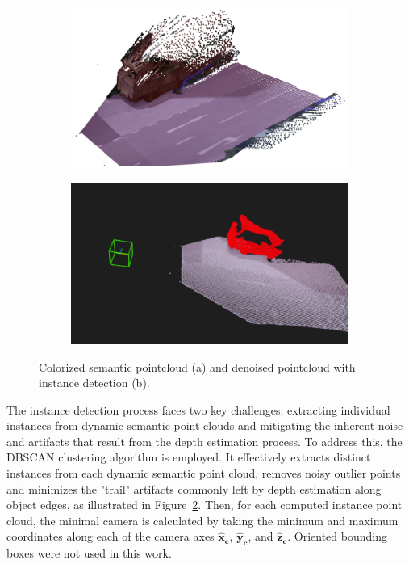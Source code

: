 \begin{figure}[!ht]
    \centering
    \begin{subfigure}[b]{0.45\textwidth}
        \includegraphics[width=\linewidth]{images/methodology/pcd_semantic.png}
        \caption{}
        \label{fig:semantic_pointcloud_a}
    \end{subfigure}
    \hfill
    \begin{subfigure}[b]{0.45\textwidth}
        \includegraphics[width=\textwidth]{images/methodology/pcd_semantic_filtered.png}
        \caption{}
        \label{fig:semantic_pointcloud_b}
    \end{subfigure}

    \caption{Colorized semantic pointcloud (a) and denoised pointcloud with instance detection (b).}
    \label{fig:semantic_pointcloud}
\end{figure}

The instance detection process faces two key challenges: extracting individual instances from dynamic semantic point clouds and mitigating the inherent noise and artifacts that result from the depth estimation process. To address this, the DBSCAN clustering algorithm is employed. It effectively extracts distinct instances from each dynamic semantic point cloud, removes noisy outlier points and minimizes the "trail" artifacts commonly left by depth estimation along object edges, as illustrated in Figure~\ref{fig:semantic_pointcloud_b}. Then, for each computed instance point cloud, the minimal camera  is calculated by taking the minimum and maximum coordinates along each of the camera axes $\mathbf{\hat{x}_c}$, $\mathbf{\hat{y}_c}$, and $\mathbf{\hat{z}_c}$. Oriented bounding boxes were not used in this work.

